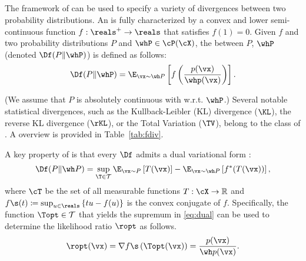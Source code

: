 \documentclass[twoside]{article}
\begin{document}
\subsection{\fdivs}

The framework of \fdivs can be used to specify a variety of divergences between two probability distributions. 
An \fdiv is fully characterized by a convex and lower semi-continuous function $f:\reals^+ \to \reals$ that satisfies  $f(1)=0$. Given $f$ and two probability distributions  $P$ and $\whP\in \cP(\cX)$, the \fdiv  between $P$, $\whP$ (denoted $\Df (P\Vert\whP )$) is defined as follows:
\begin{align}
\label{eq:fdiv}\Df (P\Vert\whP ) = \E_{\vx\sim \wh P}\left[  f\left(\frac{p(\vx)}{\whp(\vx)}\right)\right].\end{align}

(We assume that $P$ is absolutely continuous with w.r.t. $\whP$.) Several notable statistical divergences, such as the Kullback-Leibler (KL) divergence ($\KL$), the reverse KL divergence ($\rKL$), or the Total Variation ($\TV$), belong to the class of \fdivs. 
A  overview is provided in Table~\ref{tab:fdiv}.

A key property of \fdivs is that every \fdiv $\Df$ admits a dual variational form \citep{nguyen_surrogate_2009}:
\begin{equation}
\begin{aligned}
\label{eq:dual}
\Df(P \Vert \wh P)
=\sup_{\T \in \cal T} \E_{\vx\sim P}\left[T(\vx) \right] - \E_{\vx\sim \wh P}\left[ f^*(T(\vx))\right],
\end{aligned}
\end{equation}
where $\cT$ be the set of all measurable functions $T: \cX\to \mathbb{R}$ and $f\s(t) \coloneqq \sup_{u \in \reals} \left\{tu-f(u)\right\}$ is the convex conjugate of $f$. Specifically, the function $\Topt\in \cal T$ that yields the supremum in \eqref{eq:dual} can be used to determine the likelihood ratio $\ropt$ as follows.
\begin{equation}\label{eq:densityestimation}
\ropt(\vx) =  \nabla f\s \left(\Topt(\vx)\right) = \frac{p(\vx)}{\wh p (\vx)}.
\end{equation}
\end{document}
